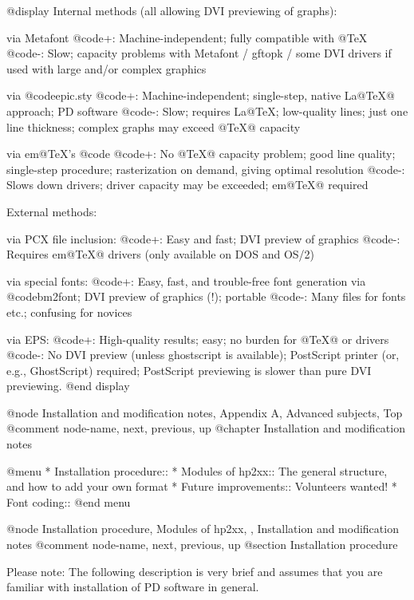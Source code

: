 @display
Internal methods (all allowing DVI previewing of graphs):

via Metafont
  @code{+:} Machine-independent; fully compatible with @TeX{}
  @code{-:} Slow; capacity problems with Metafont / gftopk / some DVI drivers
            if used with large and/or complex graphics

via @code{epic.sty}
  @code{+:} Machine-independent; single-step, native La@TeX{}@ approach; PD software
  @code{-:} Slow; requires La@TeX{}; low-quality lines; just one line thickness;
            complex graphs may exceed @TeX{}@ capacity

via em@TeX{}'s @code{}
  @code{+:} No @TeX{}@ capacity problem; good line quality; single-step procedure;
            rasterization on demand, giving optimal resolution
  @code{-:} Slows down drivers; driver capacity may be exceeded; em@TeX{}@ required


External methods:

via PCX file inclusion:
  @code{+:} Easy and fast; DVI preview of graphics
  @code{-:} Requires em@TeX{}@ drivers (only available on DOS and OS/2)

via special fonts:
  @code{+:} Easy, fast, and trouble-free font generation via @code{bm2font};
            DVI preview of graphics (!); portable
  @code{-:} Many files for fonts etc.; confusing for novices

via EPS:
  @code{+:} High-quality results; easy; no burden for @TeX{}@ or drivers
  @code{-:} No DVI preview (unless ghostscript is available); PostScript 
	    printer (or, e.g., GhostScript) required;
            PostScript previewing is slower than pure DVI previewing.
@end display




@node Installation and modification notes, Appendix A, Advanced subjects, Top
@comment  node-name,  next,  previous,  up
@chapter Installation and modification notes

@menu
* Installation procedure::
* Modules of hp2xx::       The general structure, and how to add your own format
* Future improvements::    Volunteers wanted!
* Font coding::
@end menu

@node Installation procedure, Modules of hp2xx, , Installation and modification notes
@comment  node-name,  next,  previous,  up
@section Installation procedure

Please note: The following description is very brief and assumes that you
are familiar with installation of PD software in general.

